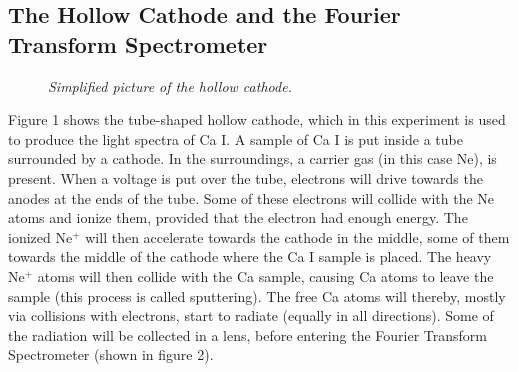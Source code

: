 \documentclass[a4paper]{article}
\begin{document}
\subsection{The Hollow Cathode and the Fourier Transform Spectrometer}

\begin{figure}[htb!]

\label{HC}

\begin{center}


\end{center}

\caption{\textit{Simplified picture of the hollow cathode.}}

\end{figure}

Figure 1 shows the tube-shaped hollow cathode, which in this experiment is used to produce the light spectra of Ca I. A sample of Ca I is put inside a tube surrounded by a cathode. In the surroundings, a carrier gas (in this case Ne), is present. When a voltage is put over the tube, electrons will drive towards the anodes at the ends of the tube. Some of these electrons will collide with the Ne atoms and ionize them, provided that the electron had enough energy. The ionized Ne$^+$ will then accelerate towards the cathode in the middle, some of them towards the middle of the cathode where the Ca I sample is placed. The heavy Ne$^+$ atoms will then collide with the Ca sample, causing Ca atoms to leave the sample (this process is called sputtering). The free Ca atoms will thereby, mostly via collisions with electrons, start to radiate (equally in all directions). Some of the radiation will be collected in a lens, before entering the Fourier Transform Spectrometer (shown in figure 2).
\end{document}
